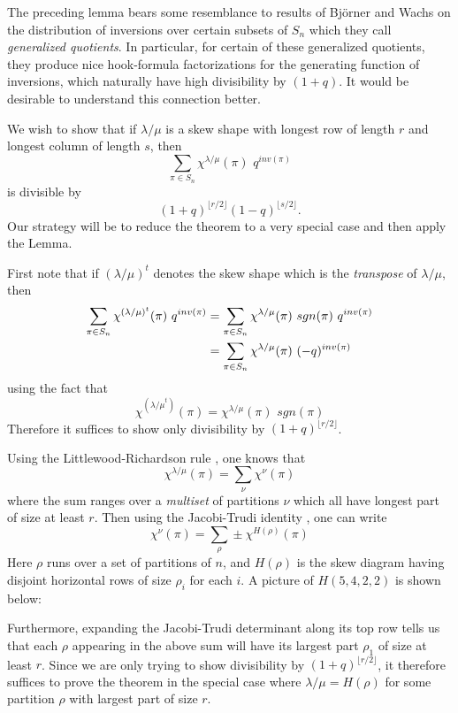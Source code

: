 The preceding lemma bears some resemblance to results of
Bj\"orner and Wachs \cite{BW} on the distribution of inversions
over certain subsets of $S_n$ which they call {\it generalized quotients}.
In particular, for certain of these generalized quotients, they
produce nice hook-formula factorizations
for the generating function of inversions,
which naturally have high divisibility by $(1+q)$.  It would
be desirable to understand this connection better.
\endrem

We wish to show that if $\lambda/\mu$ is a skew shape with
longest row of length $r$ and longest column of length $s$, then 
$$\sum_{\pi \in S_n} \chi^{\lambda/\mu}(\pi) \,\, q^{inv(\pi)} $$
is divisible by 
$$(1+q)^{\lfloor r/2 \rfloor}
  (1-q)^{\lfloor s/2 \rfloor}.$$
Our strategy will be to reduce the theorem to a very special case
and then apply the Lemma.
 
First note that if $({\lambda/\mu})^t$ denotes the skew shape which
is the {\it transpose} of ${\lambda/\mu}$, then
$$
\aligned
\sum_{\pi \in S_n} \chi^{({\lambda/\mu})^t}(\pi) \,\, q^{inv(\pi)}
 &= \sum_{\pi \in S_n}
   \chi^{\lambda/\mu}(\pi) \,\, sgn(\pi) \,\, q^{inv(\pi)} \\
 &= \sum_{\pi \in S_n}
   \chi^{\lambda/\mu}(\pi) \,\, (-q)^{inv(\pi)}
\endaligned
$$
using the fact that 
$$\chi^{({\lambda/\mu}^t)} (\pi) = \chi^{\lambda/\mu}(\pi) \,\, sgn(\pi)$$  Therefore it suffices to show only divisibility
by $(1+q)^{\lfloor r/2 \rfloor}$.
 
  Using the Littlewood-Richardson rule \cite{Sa}, one knows that
$$\chi^{\lambda/\mu}(\pi)  =  \sum_{\nu} \chi^{\nu}(\pi)$$
where the sum ranges over a {\it multiset} of partitions $\nu$ which all have
longest part of size at least $r$. Then using the Jacobi-Trudi identity \cite{Sa}, one can write 
$$\chi^{\nu}(\pi)  = \sum_{\rho} \pm \chi^{H(\rho)} (\pi)$$
Here $\rho$ runs over a set of partitions of $n$, and $H(\rho)$ is
the skew diagram having disjoint horizontal rows of size $\rho_i$ for
each $i$.  A picture of $H(5,4,2,2)$ is shown below:



Furthermore, expanding the Jacobi-Trudi determinant along its
top row tells us that each $\rho$ appearing in the above sum
will have its largest part $\rho_1$ of size at least $r$. 
Since we are only trying to show
divisibility by $(1+q)^{\lfloor r/2 \rfloor}$,  it therefore
suffices to prove the theorem in the  special case where
$\lambda/\mu = H(\rho)$ for some partition $\rho$ with largest part of size $r$.
 
